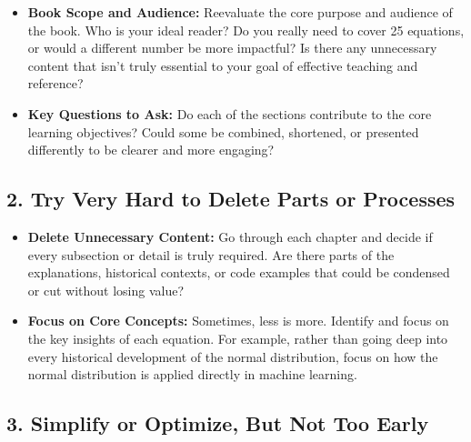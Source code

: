 \documentclass[
  12 pt,
  a4paper,
]{book}
\providecommand{\tightlist}{%
  \setlength{\itemsep}{0pt}\setlength{\parskip}{0pt}}
\numberwithin{equation}{section}
\theoremstyle{plain}      %
\theoremstyle{definition} %
\theoremstyle{remark}     %
\theoremstyle{note}         %
\begin{document}
\begin{itemize}
\tightlist
\item
  \textbf{Book Scope and Audience:} Reevaluate the core purpose and
  audience of the book. Who is your ideal reader? Do you really need to
  cover 25 equations, or would a different number be more impactful? Is
  there any unnecessary content that isn't truly essential to your goal
  of effective teaching and reference?
\item
  \textbf{Key Questions to Ask:} Do each of the sections contribute to
  the core learning objectives? Could some be combined, shortened, or
  presented differently to be clearer and more engaging?
\end{itemize}

\hypertarget{try-very-hard-to-delete-parts-or-processes}{%
\subsection*{\texorpdfstring{2. \textbf{Try Very Hard to Delete Parts or
Processes}}{2. Try Very Hard to Delete Parts or Processes}}\label{try-very-hard-to-delete-parts-or-processes}}

\begin{itemize}
\tightlist
\item
  \textbf{Delete Unnecessary Content:} Go through each chapter and
  decide if every subsection or detail is truly required. Are there
  parts of the explanations, historical contexts, or code examples that
  could be condensed or cut without losing value?
\item
  \textbf{Focus on Core Concepts:} Sometimes, less is more. Identify and
  focus on the key insights of each equation. For example, rather than
  going deep into every historical development of the normal
  distribution, focus on how the normal distribution is applied directly
  in machine learning.
\end{itemize}

\hypertarget{simplify-or-optimize-but-not-too-early}{%
\subsection*{\texorpdfstring{3. \textbf{Simplify or Optimize, But Not
Too
Early}}{3. Simplify or Optimize, But Not Too Early}}\label{simplify-or-optimize-but-not-too-early}}
\end{document}
